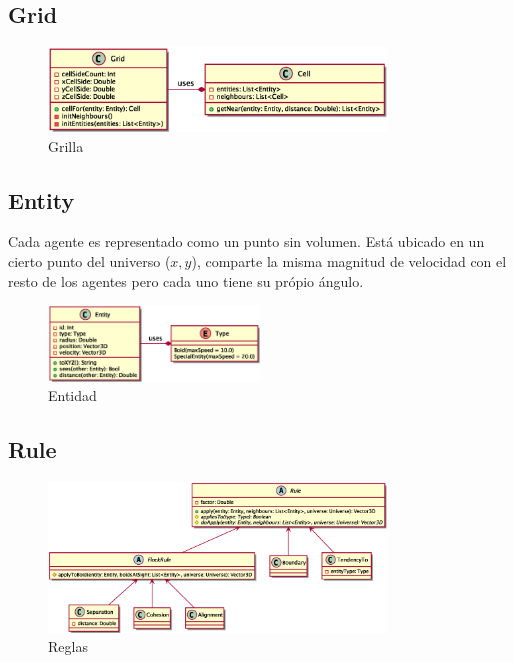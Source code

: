 \documentclass[a4paper]{article}
\begin{document}
        \subsection{Grid}

            \begin{figure}[H]
                \centering
                \includegraphics[width=0.8\textwidth]{../imgs/grid}
                \caption{Grilla}
                \label{fig:grid_implementation}
            \end{figure}

        \subsection{Entity}

            Cada agente es representado como un punto sin volumen. Está ubicado en un cierto punto del universo ($x, y$), comparte la misma magnitud de velocidad con el resto de los agentes pero cada uno tiene su própio ángulo.

            \begin{figure}[H]
                \centering
                \includegraphics[width=0.5\textwidth]{../imgs/entity}
                \caption{Entidad}
                \label{fig:entity_implementation}
            \end{figure}

        \subsection{Rule}

            \begin{figure}[H]
                \centering
                \includegraphics[width=0.8\textwidth]{../imgs/rules}
                \caption{Reglas}
                \label{fig:rules_implementation}
            \end{figure}
\end{document}
